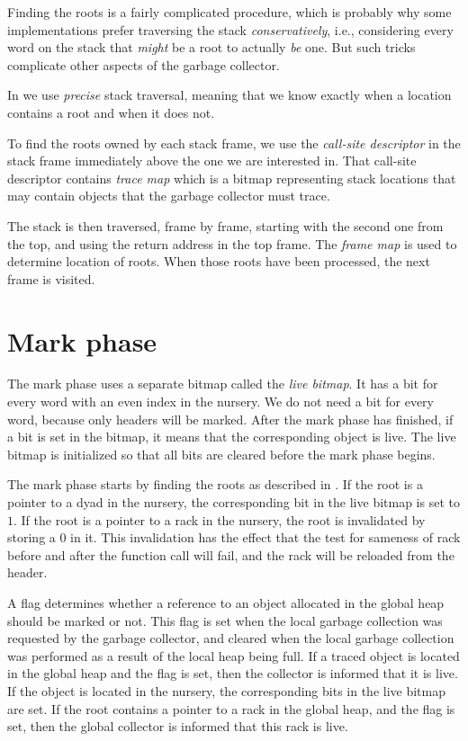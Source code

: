 Finding the roots is a fairly complicated procedure, which is probably
why some implementations prefer traversing the stack
\emph{conservatively}, i.e., considering every word on the stack that
\emph{might} be a root to actually \emph{be} one.  But such tricks
complicate other aspects of the garbage collector.

In \sysname{} we use \emph{precise} stack traversal, meaning that we
know exactly when a location contains a root and when it does not.

To find the roots owned by each stack frame, we use the
\emph{call-site descriptor}  in the
stack frame immediately above the one we are interested in.  That
call-site descriptor contains \emph{trace map} which is a bitmap
representing stack locations that may contain objects that the garbage
collector must trace.

The stack is then traversed, frame by frame, starting with the second
one from the top, and using the return address in the top frame.
The \emph{frame map} is used to determine location of roots.
When those roots have been processed, the next frame is visited.

\section{Mark phase}

The mark phase uses a separate bitmap called the \emph{live bitmap}.
It has a bit for every word with an even index in the nursery.  We do
not need a bit for every word, because only headers will be marked.
After the mark phase has finished, if a bit is set in the bitmap, it
means that the corresponding object is live.  The live bitmap is
initialized so that all bits are cleared before the mark phase begins.

The mark phase starts by finding the roots as described in
.  If the root is a
pointer to a dyad in the nursery, the corresponding bit in the live
bitmap is set to $1$.  If the root is a pointer to a rack in the
nursery, the root is invalidated by storing a $0$ in it.  This
invalidation has the effect that the test for sameness of rack before
and after the function call will fail, and the rack will be reloaded
from the header.

A flag determines whether a reference to an object allocated in the
global heap should be marked or not.  This flag is set when the local
garbage collection was requested by the garbage collector, and
cleared when the local garbage collection was performed as a result of
the local heap being full.  If a traced object is located in the
global heap and the flag is set, then the collector is informed
that it is live.  If the object is located in the nursery, the
corresponding bits in the live bitmap are set.  If the root contains a
pointer to a rack in the global heap, and the flag is set, then the
global collector is informed that this rack is live.

